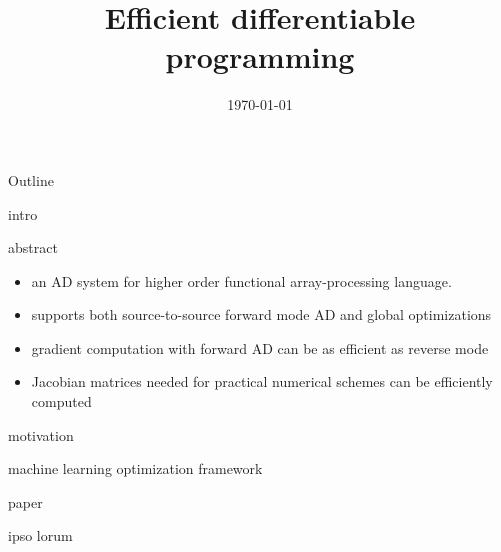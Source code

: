 \documentclass[presentation]{beamer}
\date{\today}
\title{Efficient differentiable programming}
\begin{document}
\maketitle
\begin{frame}{Outline}
\tableofcontents
\end{frame}

\begin{frame}[label={sec:orge397232}]{intro}
\begin{block}{abstract}
\begin{itemize}
\item an AD system for higher order functional array-processing language.
\item supports both source-to-source forward mode AD and global optimizations
\item gradient computation with forward AD can be as efficient as reverse mode
\item Jacobian matrices needed for practical numerical schemes can be efficiently computed
\end{itemize}
\end{block}
\end{frame}

\begin{frame}[label={sec:org7e97d3c}]{motivation}
\begin{block}{machine learning optimization framework}
\end{block}
\end{frame}

\begin{frame}[label={sec:orgcde91bd}]{paper}
\begin{block}{ipso}
lorum
\end{block}
\end{frame}
\end{document}
